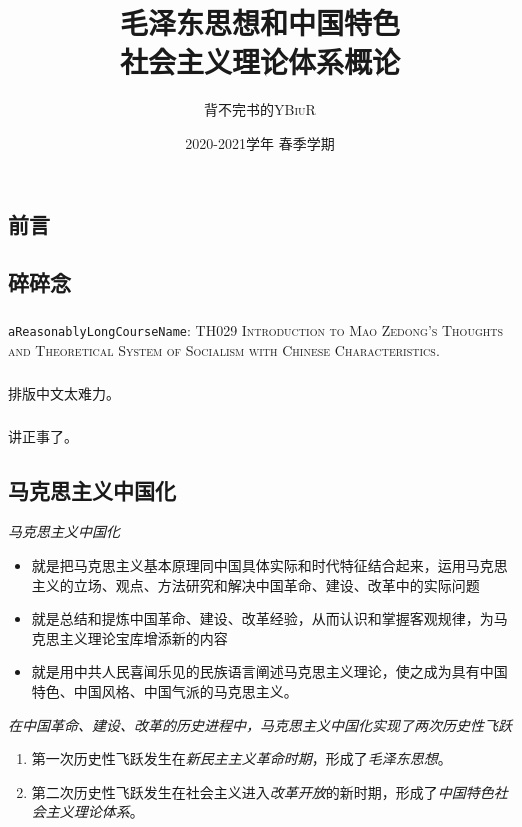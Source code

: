 \documentclass[oneside]{book}
\title{\Huge\textbf{毛泽东思想和中国特色\\社会主义理论体系概论}}
\author{背不完书的\textsc{YBiuR}}
\date{2020-2021学年{} 春季学期}
\newcommand{\firstOrder}[1]{\textcolor{WildStrawberry}{\emph{#1}}}
\begin{document}
\begin{spacing}{1.2}
\setlength{\parindent}{0em}
\setlength{\parskip}{1em}

\frontmatter
\maketitle
\chapter*{前言}
\section*{碎碎念}
\paragraph{}\verb|aReasonablyLongCourseName|: \textsc{TH029 Introduction to Mao Zedong's Thoughts and Theoretical System of Socialism with Chinese Characteristics}.
\paragraph{}排版中文太难力。
\paragraph{}讲正事了。


\section*{马克思主义中国化}
    \firstOrder{马克思主义中国化}
    \begin{itemize}
        \item 就是把马克思主义基本原理同中国具体实际和时代特征结合起来，运用马克思主义的立场、观点、方法研究和解决中国革命、建设、改革中的实际问题
        \item 就是总结和提炼中国革命、建设、改革经验，从而认识和掌握客观规律，为马克思主义理论宝库增添新的内容
        \item 就是用中共人民喜闻乐见的民族语言阐述马克思主义理论，使之成为具有中国特色、中国风格、中国气派的马克思主义。
    \end{itemize}

    \firstOrder{在中国革命、建设、改革的历史进程中，马克思主义中国化实现了两次历史性飞跃}
    \begin{enumerate}
        \item 第一次历史性飞跃发生在\emph{新民主主义革命时期}，形成了\emph{毛泽东思想}。
        \item 第二次历史性飞跃发生在社会主义进入\emph{改革开放}的新时期，形成了\emph{中国特色社会主义理论体系}。
    \end{enumerate}


\end{spacing}
\end{document}
